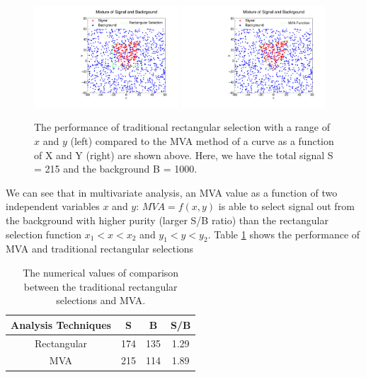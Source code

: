 \begin{figure}[h]
\begin{center}
\includegraphics[width= 0.48\textwidth]{Figures/Chapter5/Rectangular.pdf}
\includegraphics[width= 0.48\textwidth]{Figures/Chapter5/MVA.pdf}
\caption{The performance of traditional rectangular selection with a range of $x$ and $y$ (left) compared to the MVA method of a curve as a function of X and Y (right) are shown above. Here, we have the total signal S = 215 and the background B =  1000.}
\label{MVADemo}
\end{center}
\end{figure}

We can see that in multivariate analysis, an MVA value as a function of two independent variables $x$ and $y$: $MVA = f(x,y)$ is able to select signal out from the background with higher purity (larger S/B ratio) than the rectangular selection function $x_1 < x < x_2$ and $y_1 < y < y_2$. Table \ref{MVAvsRec} shows the performance of MVA and traditional rectangular selections

\begin{table}[h]
\begin{center}
\caption{The numerical values of comparison between the traditional rectangular selections and MVA.}
\vspace{1em}
\label{MVAvsRec}
  \begin{tabular}{ |c | c| c| c|}
    \hline 
Analysis Techniques &  S & B & S/B \\
     \hline
Rectangular & 174 & 135 & 1.29  \\
         \hline
MVA &   215  & 114  & 1.89  \\
     \hline
    \hline
\end{tabular}
\end{center}
\end{table}


